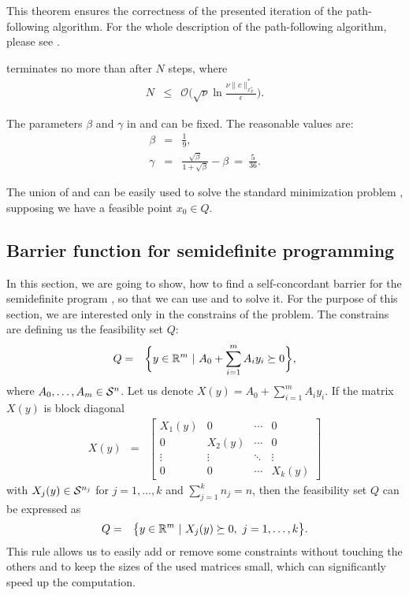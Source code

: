 This theorem ensures the correctness of the presented iteration of the path-following algorithm. For the whole description of the path-following algorithm, please see .



\begin{theorem}
   terminates no more than after $N$ steps, where
  \begin{eqnarray}
    N &\leq& \mathcal{O}\Bigg(\sqrt{\nu}\ln\frac{\nu \|c\|^*_{x^*_F}}{\epsilon}\Bigg).
  \end{eqnarray}
\end{theorem}

The parameters $\beta$ and $\gamma$ in  and  can be fixed. The reasonable values are:
\begin{eqnarray}
  \beta &=& \frac{1}{9},\\
  \gamma &=& \frac{\sqrt{\beta}}{1+\sqrt{\beta}} - \beta\ =\ \frac{5}{36}.
\end{eqnarray}

The union of  and  can be easily used to solve the standard minimization problem , supposing we have a feasible point $x_0\in Q$.

\subsection{Barrier function for semidefinite programming}
In this section, we are going to show, how to find a self-concordant barrier for the semidefinite program , so that we can use  and  to solve it.
For the purpose of this section, we are interested only in the constrains of the problem.
The constrains are defining us the feasibility set $Q$:
\begin{eqnarray}
  Q &=& \bigg\{y\in\mathbb{R}^m\ |\ A_0 + \sum_{i=1}^mA_iy_i \succeq 0\bigg\},
\end{eqnarray}
where $A_0, \ldots, A_m \in\mathcal{S}^n$.
Let us denote $X(y) = A_0 + \sum_{i=1}^mA_iy_i$.
If the matrix $X(y)$ is block diagonal
\begin{eqnarray}
  X(y) &=& \begin{bmatrix}
          X_1(y) & 0      & \cdots & 0      \\
          0      & X_2(y) & \cdots & 0      \\
          \vdots & \vdots & \ddots & \vdots \\
          0      & 0      & \cdots & X_k(y)
        \end{bmatrix}
\end{eqnarray}
with $X_j(y)\in\mathcal{S}^{n_j}$ for $j = 1, \ldots, k$ and $\sum_{j=1}^k n_j = n$, then the feasibility set $Q$ can be expressed as
\begin{eqnarray}
  Q &=& \big\{y\in\mathbb{R}^m\ |\ X_j(y) \succeq 0,\ j = 1,\ldots, k\big\}.
\end{eqnarray}
This rule allows us to easily add or remove some constraints without touching the others and to keep the sizes of the used matrices small, which can significantly speed up the computation.

